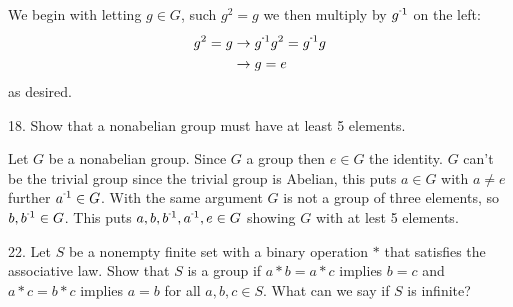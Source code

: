 \begin{mdframed}[style=darkAnswer,frametitle={Joe Starr}]
  We begin with letting $g\in G$, such $g^2=g$ we then multiply by $\inv{g}$ on 
  the left:
  \begin{align*}
    g^2=g & \rightarrow \inv{g}g^2=\inv{g}g \\
          & \rightarrow g=e                 
  \end{align*}
  as desired. 
\end{mdframed}
\newpage
\begin{mdframed}[style=darkQuesion]
  18. Show that a nonabelian group must have at least 5 elements. 
\end{mdframed}

\begin{mdframed}[style=darkAnswer,frametitle={Joe Starr}]
  Let $G$ be a nonabelian group. Since $G$ a group then $e\in G$ the identity. $G$
  can't be the trivial group since the trivial group is Abelian, this puts 
  $a\in G$ with $a\neq e$ further $\inv{a}\in G$. With the same argument $G$ is 
  not a group of three elements, so $b,\inv{b}\in G$. This puts 
  $a,b,\inv{b},\inv{a},e\in G$ showing $G$ with at lest 5 elements.
\end{mdframed}
\newpage
\begin{mdframed}[style=darkQuesion]
  22. Let $S$ be a nonempty finite set with a binary operation $\ast$ that 
  satisfies the associative law. Show that $S$ is a group if $a\ast b=a\ast c$
  implies $b=c$ and $a\ast c= b\ast c$ implies $a=b$ for all $a,b,c \in S$.
  What can we say if $S$ is infinite? 
\end{mdframed}

